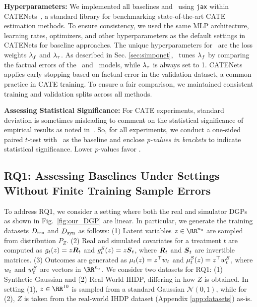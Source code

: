\textbf{Hyperparameters:}
% 
We implemented all baselines and \our\ using \texttt{jax} within CATENets~\citep{benchmarking}, a standard library for benchmarking state-of-the-art CATE estimation methods. To ensure consistency, we used the same MLP architecture, learning rates, optimizers, and other hyperparameters as the default settings in CATENets for baseline approaches. The unique hyperparameters for \our\ are the loss weights $\lambda_{f}$ and $\lambda_{\tau}$. As described in Sec. \ref{sec:simponet}, \our\ tunes $\lambda_{f}$ by comparing the factual errors of the \realonly\ and \muonly\ models, while $\lambda_{\tau}$ is always set to 1. CATENets applies early stopping based on factual error in the validation dataset, a common practice in CATE training. To ensure a fair comparison, we maintained consistent training and validation splits across all methods.

\textbf{Assessing Statistical Significance:} For CATE experiments, standard deviation is sometimes misleading to comment on the statistical significance of empirical results as noted in~\citep{benchmarking}. So, for all experiments, we conduct a one-sided paired $t$-test with \our\ as the baseline and enclose \textit{p-values in brackets} to indicate statistical significance. Lower $p$-values favor \our.

\subsection{RQ1: Assessing Baselines Under Settings Without Finite Training Sample Errors}
\label{sec:rq1}

To address RQ1, we consider a setting where both the real and simulator DGPs as shown in Fig.~\ref{fig:our_DGP} are linear. 
In particular, we generate the training datasets $D_{\text{trn}}$ and $D_{\text{syn}}$ as follows: (1) Latent variables $z \in \RR^{n_z}$ are sampled from distribution $P_Z$. (2) Real and simulated covariates for a treatment $t$ are computed as $g_t(z) = z \boldsymbol{R}_t$ and $g^S_t(z) = z \boldsymbol{S}_t$, where $\boldsymbol{R}_t$ and $\boldsymbol{S}_t$ are invertible matrices. (3) Outcomes are generated as $\mu_t(z) = z^\top w_{t}$ and $\mu^S_t(z) = z^\top w_{t}^S$, where $w_{t}$ and $w_{t}^S$ are vectors in $\RR^{n_z}$. We consider two datasets for RQ1: (1) Synthetic-Gaussian and (2) Real World-IHDP, differing in how $Z$ is obtained. In setting (1), $z \in \RR^{10}$ is sampled from a standard Gaussian $\mathcal{N}(0, 1)$, while for (2), $Z$ is taken from the real-world IHDP dataset (Appendix \ref{app:datasets}) as-is. 

